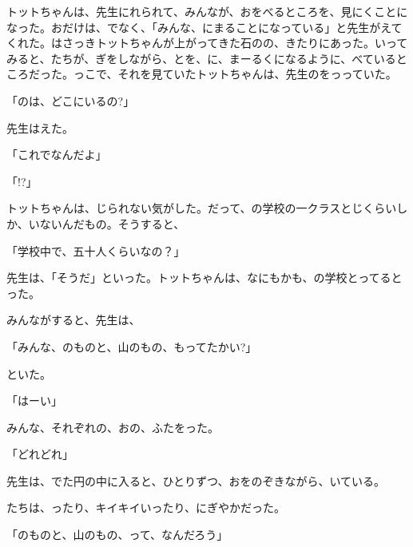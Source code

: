 トットちゃんは、先生にれられて、みんなが、おをべるところを、見にくことになった。おだけは、でなく、「みんな、にまることになっている」と先生がえてくれた。はさっきトットちゃんが上がってきた石のの、きたりにあった。いってみると、たちが、ぎをしながら、とを、に、まーるくになるように、べているところだった。っこで、それを見ていたトットちゃんは、先生のをっっていた。

「のは、どこにいるの?」

先生はえた。

「これでなんだよ」

「!?」

トットちゃんは、じられない気がした。だって、の学校の一クラスとじくらいしか、いないんだもの。そうすると、

「学校中で、五十人くらいなの？」

先生は、「そうだ」といった。トットちゃんは、なにもかも、の学校とってるとった。

みんながすると、先生は、

「みんな、のものと、山のもの、もってたかい?」

といた。

「はーい」

みんな、それぞれの、おの、ふたをった。

「どれどれ」

先生は、でた円の中に入ると、ひとりずつ、おをのぞきながら、いている。

たちは、ったり、キイキイいったり、にぎやかだった。

「のものと、山のもの、って、なんだろう」

